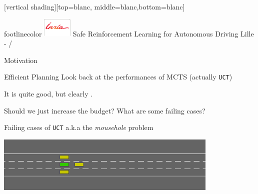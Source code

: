 \documentclass{beamer}
\begin{document}
\begin{frame}

\vspace*{-4pt}
\end{frame}

[vertical shading][top=blanc, middle=blanc,bottom=blanc]
{
\begin{beamercolorbox}[wd=1\paperwidth,ht=15.5pt]{footlinecolor}
		\hspace{3mm}
		\includegraphics[width=14mm]{inria/logobastrans}
		\hspace{.4cm}
		\raisebox{3.2ex}
		{\scriptsize Safe Reinforcement Learning for Autonomous Driving}\hfill
		\raisebox{3.2ex}
		{Lille - \insertframenumber/\inserttotalframenumber \hspace{5mm}
			\null }
\end{beamercolorbox}
}

\begin{frame}{Motivation}


\end{frame}

\begin{frame}{Efficient Planning}
    Look back at the performances of MCTS (actually \texttt{UCT})

    It is quite good, but clearly .
    
    \bigskip
    Should we just increase the budget?
    What are some failing cases?
\end{frame}

\begin{frame}{Failing cases of \texttt{UCT}}
    a.k.a the \emph{mousehole} problem
    \begin{center}
    \includegraphics[width=0.8\textwidth]{img/uct_trap}\\
    \bigskip
    
    \end{center}
\end{frame}
\end{document}
